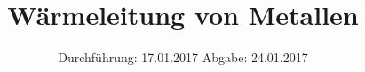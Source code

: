 


\subject{V204}
\title{Wärmeleitung von Metallen}
\date{
	Durchführung: 17.01.2017
	\hspace{4em}
	Abgabe: 24.01.2017
}


	\maketitle
	\newpage
	\tableofcontents
	\newpage
	
	
	
	
	
	
	\newpage
	
	\printbibliography

